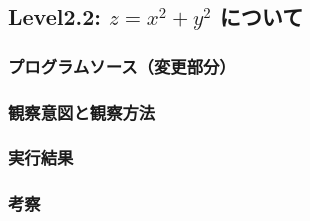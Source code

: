 \subsection{Level2.2: $z=x^2 + y^2$ について}
\subsubsection{プログラムソース（変更部分）}
\subsubsection{観察意図と観察方法}
\subsubsection{実行結果}
\subsubsection{考察}

